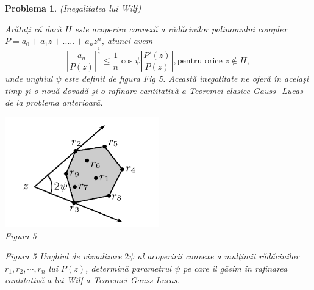 \documentclass[a4paper,12pt,oneside]{report}
\newtheorem{problem}{Problema}
\begin{document}
\begin{problem} (Inegalitatea lui Wilf)

Ar\u{a}ta\c{t}i c\u{a} dac\u{a} \(H\) este acoperira convex\u{a} a r\u{a}d\u{a}cinilor polinomului complex \(P = a_{0} + a_{1}z + ..... +a_{n}z^{n}\), atunci avem
\begin{displaymath}
  \left | \frac{a_{n}}{P\left ( z \right )} \right |^{\frac{1}{n}}\leq \frac{1}n\cos{\psi }\left | \frac{{P}'\left ( z \right )}{P\left ( z \right )} \right | , \text{pentru orice } z\notin H, \label{eq:2.16} \tag{2.16}
\end{displaymath}
unde unghiul \(\psi\) este definit de figura Fig 5. Aceast\u{a} inegalitate ne ofer\u{a} \^{i}n acela\c{s}i timp \c{s}i o nou\u{a} dovad\u{a} \c{s}i o rafinare cantitativ\u{a}  a Teoremei clasice Gauss- Lucas de la problema anterioar\u{a}.
\begin{center}
	\includegraphics[width=0.5\textwidth]{fig_pb14.png}
	\\ Figura 5
\end{center}
Figura 5  Unghiul de vizualizare \(2\psi\) al acoperirii convexe a mul\c{t}imii r\u{a}d\u{a}cinilor \(r_{1} , r_{2} , \cdots, r_{n}\)  lui \(P\left ( z \right )\), determin\u{a} parametrul \(\psi\) pe care \^{i}l g\u{a}sim \^{i}n rafinarea cantitativ\u{a} a lui Wilf a Teoremei Gauss-Lucas.
\end{problem}
\end{document}
